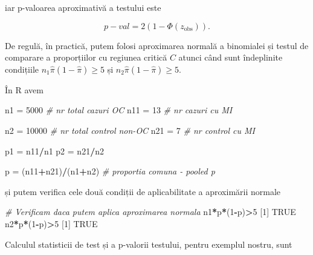 \documentclass[]{article}
\newenvironment{Shaded}{\begin{snugshade}}{\end{snugshade}}
\newcommand{\DecValTok}[1]{\textcolor[rgb]{0.00,0.00,0.81}{#1}}
\newcommand{\StringTok}[1]{\textcolor[rgb]{0.31,0.60,0.02}{#1}}
\newcommand{\CommentTok}[1]{\textcolor[rgb]{0.56,0.35,0.01}{\textit{#1}}}
\newcommand{\OtherTok}[1]{\textcolor[rgb]{0.56,0.35,0.01}{#1}}
\newcommand{\OperatorTok}[1]{\textcolor[rgb]{0.81,0.36,0.00}{\textbf{#1}}}
\newcommand{\NormalTok}[1]{#1}
\begin{document}
iar p-valoarea aproximativă a testului este

\[
  p-val = 2(1-\Phi(z_{\text{obs}})).
\]

De regulă, în practică, putem folosi aproximarea normală a binomialei și
testul de comparare a proporțiilor cu regiunea critică \(C\) atunci când
sunt îndeplinite condițiile \(n_1\hat{\pi}(1-\hat{\pi})\geq 5\) și
\(n_2\hat{\pi}(1-\hat{\pi})\geq 5\).

În R avem

\begin{Shaded}
\begin{Highlighting}[]
\NormalTok{n1 =}\StringTok{ }\DecValTok{5000} \CommentTok{# nr total cazuri OC}
\NormalTok{n11 =}\StringTok{ }\DecValTok{13} \CommentTok{# nr cazuri cu MI}

\NormalTok{n2 =}\StringTok{ }\DecValTok{10000} \CommentTok{# nr total control non-OC}
\NormalTok{n21 =}\StringTok{ }\DecValTok{7} \CommentTok{# nr control cu MI}

\NormalTok{p1 =}\StringTok{ }\NormalTok{n11}\OperatorTok{/}\NormalTok{n1}
\NormalTok{p2 =}\StringTok{ }\NormalTok{n21}\OperatorTok{/}\NormalTok{n2}

\NormalTok{p =}\StringTok{ }\NormalTok{(n11}\OperatorTok{+}\NormalTok{n21)}\OperatorTok{/}\NormalTok{(n1}\OperatorTok{+}\NormalTok{n2) }\CommentTok{# proportia comuna - pooled p}
\end{Highlighting}
\end{Shaded}

și putem verifica cele două condiții de aplicabilitate a aproximării
normale

\begin{Shaded}
\begin{Highlighting}[]
\CommentTok{# Verificam daca putem aplica aproximarea normala }
\NormalTok{n1}\OperatorTok{*}\NormalTok{p}\OperatorTok{*}\NormalTok{(}\DecValTok{1}\OperatorTok{-}\NormalTok{p)}\OperatorTok{>}\DecValTok{5}
\NormalTok{[}\DecValTok{1}\NormalTok{] }\OtherTok{TRUE}
\NormalTok{n2}\OperatorTok{*}\NormalTok{p}\OperatorTok{*}\NormalTok{(}\DecValTok{1}\OperatorTok{-}\NormalTok{p)}\OperatorTok{>}\DecValTok{5}
\NormalTok{[}\DecValTok{1}\NormalTok{] }\OtherTok{TRUE}
\end{Highlighting}
\end{Shaded}

Calculul statisticii de test și a p-valorii testului, pentru exemplul
nostru, sunt
\end{document}
